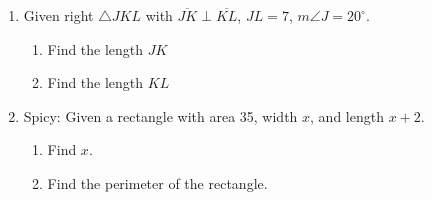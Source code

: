 \begin{enumerate}
\item Given right $\triangle JKL$ with $\overline{JK} \perp \overline{KL}$, $JL=7$, $m\angle J=20^\circ$.
  \begin{center}
     \vspace{1cm}
  \end{center}
  \begin{enumerate}
    \item Find the length $JK$\\[3cm]
    \item Find the length $KL$\\[2cm]
  \end{enumerate}

\item Spicy: Given a rectangle with area 35, width $x$, and length $x+2$.
  \begin{enumerate}
    \item Find $x$.\\[4cm]
    \item Find the perimeter of the rectangle.
  \end{enumerate}


  
\end{enumerate}

